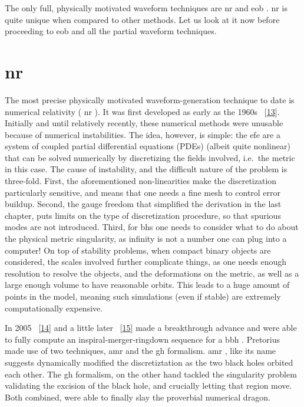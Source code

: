 \documentclass[
  10pt,
  a4paper,
  DIV=11,
  numbers=noendperiod,
  twoside]{scrreprt}
\DeclareRobustCommand{\[}{\begin{equation}}
\DeclareRobustCommand{\]}{\end{equation}}
\begin{document}
The only full, physically motivated waveform techniques are \gls{nr} and
\gls{eob} . \gls{nr} is quite unique when
compared to other methods. Let us look at it now before proceeding to
\gls{eob} and all the partial waveform techniques.

\hypertarget{nr}{%
\section{\texorpdfstring{\gls{nr}}{}}\label{nr}}

The most precise physically motivated waveform-generation technique to
date is numerical relativity ( \gls{nr} ). It was first developed as
early as the 1960s ~{[}\protect\hyperlink{ref-hahn:1964}{13}{]}.
Initially and until relatively recently, these numerical methods were
unusable because of numerical instabilities. The idea, however, is
simple: the \gls{efe} are a system of coupled partial differential
equations (PDEs) (albeit quite nonlinear) that can be solved numerically
by discretizing the fields involved, i.e.~the metric in this case. The
cause of instability, and the difficult nature of the problem is
three-fold. First, the aforementioned non-linearities make the
discretization particularly sensitive, and means that one needs a fine
mesh to control error buildup. Second, the gauge freedom that simplified
the derivation in the last chapter, puts limits on the type of
discretization procedure, so that spurious modes are not introduced.
Third, for \glspl{bh} one needs to consider what to do about the
physical metric singularity, as infinity is not a number one can plug
into a computer! On top of stability problems, when compact binary
objects are considered, the scales involved further complicate things,
as one needs enough resolution to resolve the objects, and the
deformations on the metric, as well as a large enough volume to have
reasonable orbits. This leads to a huge amount of points in the model,
meaning such simulations (even if stable) are extremely computationally
expensive.

In 2005 ~{[}\protect\hyperlink{ref-Pretorius:2005gq}{14}{]} and a little
later ~{[}\protect\hyperlink{ref-Campanelli:2005dd}{15}{]} made a
breakthrough advance and were able to fully compute an
inspiral-merger-ringdown sequence for a \gls{bbh} . Pretorius made use
of two techniques, \gls{amr} and the \gls{gh} formalism. \gls{amr} ,
like its name suggests dynamically modified the discretiztation as the
two black holes orbited each other. The \gls{gh} formalism, on the other
hand tackled the singularity problem validating the excision of the
black hole, and crucially letting that region move. Both combined, were
able to finally slay the proverbial numerical dragon.
\end{document}
